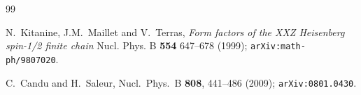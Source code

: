\documentclass[a4paper,10pt]{article}
\newcommand{\linnea}[1]{$\framebox{\tiny L}$\ \textbf{\texttt{{\color{red}\footnotesize#1}}}}
\newcommand{\jesper}[1]{$\framebox{\tiny J}$\ \textbf{\texttt{{\color{cyan}\footnotesize#1}}}}
\begin{document}
\begin{thebibliography}{99}


 N.\ Kitanine, J.M.\ Maillet and V.\ Terras, {\sl Form factors of the XXZ Heisenberg spin-1/2 finite chain} Nucl. Phys. B \textbf{554} 647--678 (1999); {\tt arXiv:math-ph/9807020}.


 C.\ Candu and H.\ Saleur, Nucl.\ Phys.\ B {\bf 808}, 441--486 (2009); {\tt arXiv:0801.0430}.













\end{thebibliography}
\end{document}
